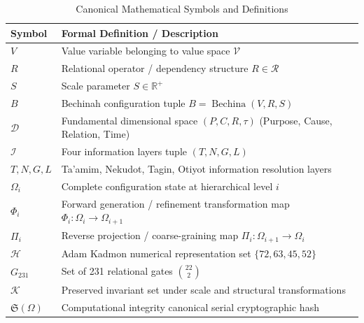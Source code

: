 \documentclass[11pt,a4paper,titlepage]{article}
\theoremstyle{definition}
\theoremstyle{remark}
\begin{document}
\begin{table}[h!]
\centering
\small
\begin{tabularx}{\textwidth}{l X}
\toprule
\textbf{Symbol} & \textbf{Formal Definition / Description} \\
\midrule
$V$ & Value variable belonging to value space $\mathcal{V}$ \\
$R$ & Relational operator / dependency structure $R \in \mathcal{R}$ \\
$S$ & Scale parameter $S \in \mathbb{R}^+$ \\
$B$ & Bechinah configuration tuple $B = \operatorname{Bechina}(V,R,S)$ \\
$\mathcal{D}$ & Fundamental dimensional space $(P,C,R,\tau)$ (Purpose, Cause, Relation, Time) \\
$\mathcal{I}$ & Four information layers tuple $(T, N, G, L)$ \\
$T, N, G, L$ & Ta'amim, Nekudot, Tagin, Otiyot information resolution layers \\
$\Omega_i$ & Complete configuration state at hierarchical level $i$ \\
$\Phi_i$ & Forward generation / refinement transformation map $\Phi_i: \Omega_i \to \Omega_{i+1}$ \\
$\Pi_i$ & Reverse projection / coarse-graining map $\Pi_i: \Omega_{i+1} \to \Omega_i$ \\
$\mathcal{H}$ & Adam Kadmon numerical representation set $\{72, 63, 45, 52\}$ \\
$G_{231}$ & Set of 231 relational gates $\binom{22}{2}$ \\
$\mathcal{K}$ & Preserved invariant set under scale and structural transformations \\
$\mathfrak{S}(\Omega)$ & Computational integrity canonical serial cryptographic hash \\
\bottomrule
\end{tabularx}
\caption{Canonical Mathematical Symbols and Definitions}
\end{table}

\newpage














\end{document}
